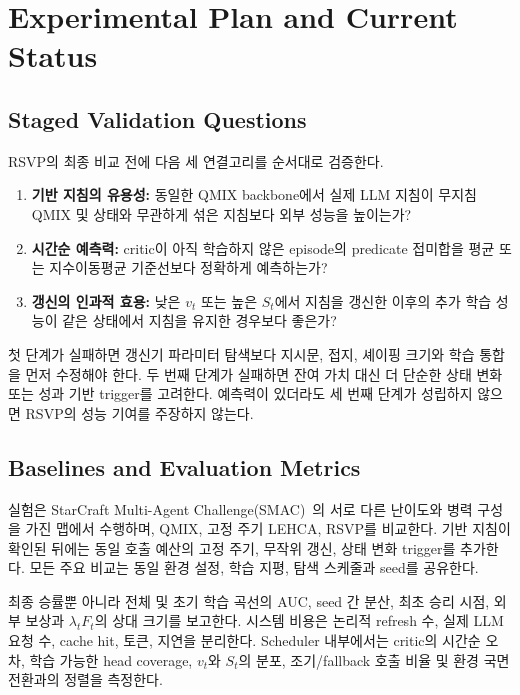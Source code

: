 \section{Experimental Plan and Current Status}

\subsection{Staged Validation Questions}

RSVP의 최종 비교 전에 다음 세 연결고리를 순서대로 검증한다.

\begin{enumerate}
  \item \textbf{기반 지침의 유용성:} 동일한 QMIX backbone에서 실제 LLM 지침이
        무지침 QMIX 및 상태와 무관하게 섞은 지침보다 외부 성능을 높이는가?
  \item \textbf{시간순 예측력:} critic이 아직 학습하지 않은 episode의 predicate
        접미합을 평균 또는 지수이동평균 기준선보다 정확하게 예측하는가?
  \item \textbf{갱신의 인과적 효용:} 낮은 $v_t$ 또는 높은 $S_t$에서 지침을
        갱신한 이후의 추가 학습 성능이 같은 상태에서 지침을 유지한 경우보다 좋은가?
\end{enumerate}

첫 단계가 실패하면 갱신기 파라미터 탐색보다 지시문, 접지, 셰이핑 크기와 학습 통합을
먼저 수정해야 한다. 두 번째 단계가 실패하면 잔여 가치 대신 더 단순한
상태 변화 또는 성과 기반 trigger를 고려한다. 예측력이 있더라도 세 번째 단계가
성립하지 않으면 RSVP의 성능 기여를 주장하지 않는다.

\subsection{Baselines and Evaluation Metrics}

실험은 StarCraft Multi-Agent Challenge(SMAC)~\cite{samvelyan2019smac}의 서로 다른
난이도와 병력 구성을 가진 맵에서 수행하며, QMIX, 고정 주기 LEHCA, RSVP를 비교한다.
기반 지침이 확인된 뒤에는 동일 호출 예산의 고정 주기, 무작위 갱신,
상태 변화 trigger를 추가한다. 모든 주요 비교는 동일 환경 설정, 학습 지평, 탐색
스케줄과 seed를 공유한다.

최종 승률뿐 아니라 전체 및 초기 학습 곡선의 AUC, seed 간 분산, 최초 승리 시점,
외부 보상과 $\lambda_tF_t$의 상대 크기를 보고한다. 시스템 비용은 논리적 refresh 수,
실제 LLM 요청 수, cache hit, 토큰, 지연을 분리한다. Scheduler 내부에서는 critic의
시간순 오차, 학습 가능한 head coverage, $v_t$와 $S_t$의 분포, 조기/fallback 호출
비율 및 환경 국면 전환과의 정렬을 측정한다.

